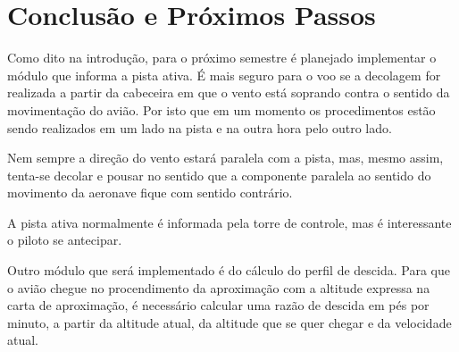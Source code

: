 \section{Conclusão e Próximos Passos}

Como dito na introdução, para o próximo semestre é planejado implementar o módulo que
informa a pista ativa. É mais seguro para o voo se a decolagem for realizada a 
partir da cabeceira em que o vento está soprando contra o sentido da movimentação
do avião. Por isto que em um momento os procedimentos estão sendo realizados em
um lado na pista e na outra hora pelo outro lado.

Nem sempre a direção do vento estará paralela com a pista, mas, mesmo assim,
tenta-se decolar e pousar no sentido que a componente paralela ao sentido do 
movimento da aeronave fique com sentido contrário.

A pista ativa normalmente é informada pela torre de controle, mas é interessante
o piloto se antecipar.

Outro módulo que será implementado é do cálculo do perfil de descida. Para que o 
avião chegue no procendimento da aproximação com a altitude expressa na carta de
aproximação, é necessário calcular uma razão de descida em pés por minuto, a partir
da altitude atual, da altitude que se quer chegar e da velocidade atual.